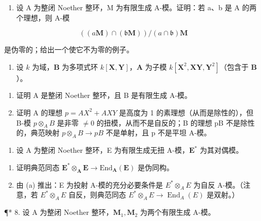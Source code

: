 \begin{enumerate}
\def\labelenumi{\arabic{enumi}.}
\setcounter{enumi}{4}
\tightlist
\item
  设 A 为整闭 Noether 整环，M 为有限生成 A-模。证明：若 a、b 是 A 的两个理想，则 A-模
\end{enumerate}

\[
((a \mathbf {M}) \cap (\mathfrak {b} \mathbf {M})) / (a \cap \mathfrak {b}) \mathbf {M}
\]

是伪零的；给出一个使它不为零的例子。

\begin{enumerate}
\def\labelenumi{\arabic{enumi}.}
\setcounter{enumi}{5}
\tightlist
\item
  设 \(k\) 为域，\(\mathbf{B}\) 为多项式环 \(k[\mathbf{X},\mathbf{Y}]\)，\(\mathbf{A}\) 为子模 \(k[\mathbf{X}^2,\mathbf{XY},\mathbf{Y}^2]\)（包含于 \(\mathbf{B}\)）。
\end{enumerate}

\begin{enumerate}
\def\labelenumi{(\alph{enumi})}
\item
  证明 A 是整闭 Noether 整环，且 B 是有限生成 A-模。
\item
  证明 A 的理想 \(p = AX^{2} + AXY\) 是高度为 1 的素理想（从而是除性的），但 B-模 \(p \otimes_{A} B\) 是非零 \(\neq 0\) 的扭模，从而不是自反的；B 的理想 pB 不是除性的，典范映射 \(p \otimes_{A} B \to pB\) 不是单射，且 p 不是平坦 A-模。
\end{enumerate}

\begin{enumerate}
\def\labelenumi{\arabic{enumi}.}
\setcounter{enumi}{6}
\tightlist
\item
  设 A 为整闭 Noether 整环，E 为有限生成无扭 A-模，\(\mathbf{E}^*\) 为其对偶模。
\end{enumerate}

\begin{enumerate}
\def\labelenumi{(\alph{enumi})}
\item
  证明典范同态 \(\mathbf{E}^{*}\otimes_{\mathbf{A}}\mathbf{E}\to \mathrm{End}_{\mathbf{A}}(\mathbf{E})\) 是伪同构。
\item
  由 (a) 推出：E 为投射 A-模的充分必要条件是 \(E^{*} \otimes_{A} E\) 为自反 A-模。（注意，若 \(E^{*} \otimes_{A} E\) 自反，则典范同态 \(E^{*} \otimes_{A} E \to \operatorname{End}_{A}(E)\) 是双射。）
\end{enumerate}

¶* 8. 设 A 为整闭 Noether 整环，\(\mathbf{M}_1, \mathbf{M}_2\) 为两个有限生成 A-模。


